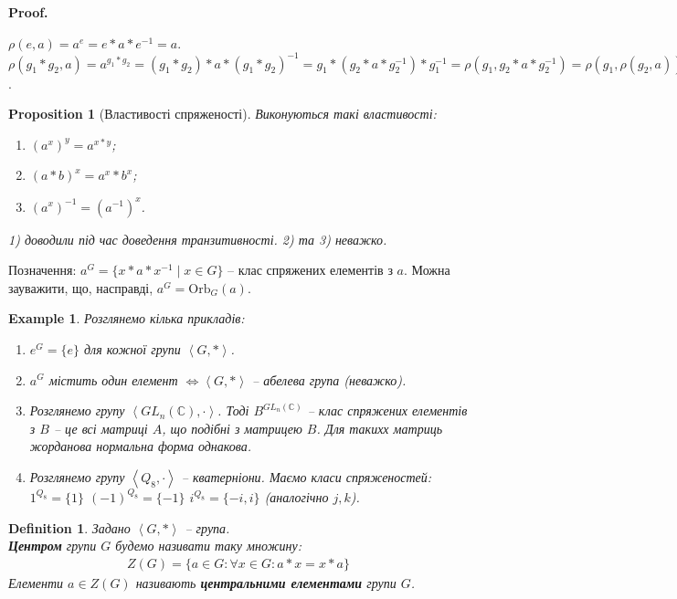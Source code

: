\documentclass[a4paper, 10pt]{article}
\makeatletter
\theoremstyle{theoremdd}
\theoremstyle{theoremdd}
\newtheorem{definition}[theorem]{Definition}
\theoremstyle{theoremdd}
\theoremstyle{theoremdd}
\theoremstyle{theoremdd}
\newtheorem{example}[theorem]{Example}
\theoremstyle{theoremdd}
\theoremstyle{theoremdd}
\theoremstyle{theoremdd}
\theoremstyle{theoremdd}
\newtheorem{proposition}[theorem]{Proposition}
\theoremstyle{theoremdd}
\theoremstyle{theoremdd}
\theoremstyle{theoremdd}
\theoremstyle{theoremdd}
\theoremstyle{theoremdd}
\theoremstyle{theoremdd}
\renewenvironment{proof}[1][Proof.\\]{\par
\pushQED{\hfill \qed}%
\normalfont \topsep6\p@\@plus6\p@\relax
\trivlist
\item\relax
{\bfseries
#1\@addpunct{.}}\hspace\labelsep\ignorespaces
}{%
\popQED\endtrivlist\@endpefalse
}
\newcommand\Orb{\text{Orb}}
\makeatother
\begin{document}
\begin{proof}
$\rho(e,a) = a^e = e*a*e^{-1} = a$.\\
$\rho(g_1*g_2,a) = a^{g_1*g_2} = (g_1*g_2)*a*(g_1*g_2)^{-1} = g_1*(g_2*a*g_2^{-1})*g_1^{-1} = \rho(g_1,g_2*a*g_2^{-1}) = \rho(g_1,\rho(g_2,a))$.
\end{proof}

\begin{proposition}[Властивості спряженості]
Виконуються такі властивості:
\begin{enumerate}[nosep,wide=0pt,label={\arabic*)}]
\item $(a^x)^y = a^{x*y}$;
\item $(a*b)^x = a^x*b^x$;
\item $(a^x)^{-1} = (a^{-1})^x$.
\end{enumerate}
\textit{1) доводили під час доведення транзитивності. 2) та 3) неважко.}
\end{proposition}

Позначення: $a^G = \{ x*a*x^{-1} \mid x \in G\}$ -- клас спряжених елементів з $a$. Можна зауважити, що, насправді, $a^G = \Orb_G(a)$.

\begin{example}
Розглянемо кілька прикладів:
\begin{enumerate}[nosep,wide=0pt,label={\arabic*.}]
\item $e^G = \{e\}$ для кожної групи $\left<G,*\right>$.
\item $a^G$ містить один елемент $\iff \left<G,* \right>$ -- абелева група (неважко).
\item Розглянемо групу $\left< GL_n(\mathbb{C}), \cdot \right>$. Тоді $B^{GL_n(\mathbb{C})}$ -- клас спряжених елементів з $B$ -- це всі матриці $A$, що подібні з матрицею $B$. Для такихх матриць жорданова нормальна форма однакова.
\item Розглянемо групу $\left< Q_8, \cdot \right>$ -- кватерніони. Маємо класи спряженостей:\\
$1^{Q_8} = \{1\}$ \hspace{0.5cm} $(-1)^{Q_8} = \{-1\}$ \hspace{0.5cm} $i^{Q_8} = \{-i,i\}$ (аналогічно $j,k$).
\end{enumerate}
\end{example}

\begin{definition}
Задано $\left< G, *\right>$ -- група.\\
\textbf{Центром} групи $G$ будемо називати таку множину:
\begin{align*}
Z(G) = \{ a \in G: \forall x \in G: a*x = x*a\}
\end{align*}
Елементи $a \in Z(G)$ називають \textbf{центральними елементами} групи $G$.
\end{definition}
\end{document}
